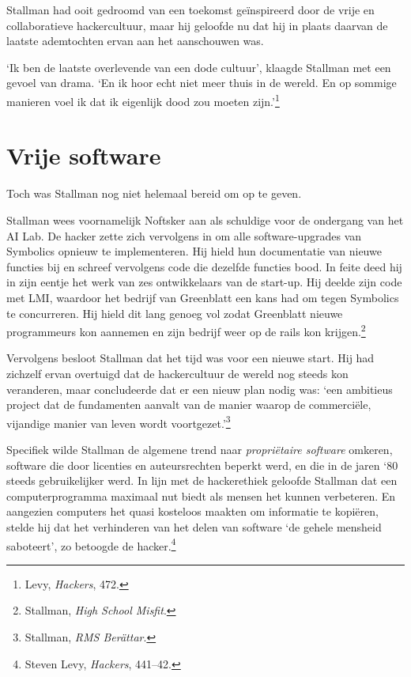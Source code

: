 \documentclass[
  a5paper,
  smalldemyvopaper,11pt,twoside,onecolumn,openright,extrafontsizes,
hidelinks]{memoir}
\begin{document}
Stallman had ooit gedroomd van een toekomst geïnspireerd door de vrije
en collaboratieve hackercultuur, maar hij geloofde nu dat hij in plaats
daarvan de laatste ademtochten ervan aan het aanschouwen was.

`Ik ben de laatste overlevende van een dode cultuur', klaagde Stallman
met een gevoel van drama. `En ik hoor echt niet meer thuis in de wereld.
En op sommige manieren voel ik dat ik eigenlijk dood zou moeten
zijn.'\footnote{\hspace{0pt}Levy, \emph{Hackers}, 472.}

\section{Vrije software}\label{vrije-software}

Toch was Stallman nog niet helemaal bereid om op te geven.

Stallman wees voornamelijk Noftsker aan als schuldige voor de ondergang
van het AI Lab. De hacker zette zich vervolgens in om alle
software-upgrades van Symbolics opnieuw te implementeren. Hij hield hun
documentatie van nieuwe functies bij en schreef vervolgens code die
dezelfde functies bood. In feite deed hij in zijn eentje het werk van
zes ontwikkelaars van de start-up. Hij deelde zijn code met LMI,
waardoor het bedrijf van Greenblatt een kans had om tegen Symbolics te
concurreren. Hij hield dit lang genoeg vol zodat Greenblatt nieuwe
programmeurs kon aannemen en zijn bedrijf weer op de rails kon
krijgen.\footnote{\hspace{0pt}Stallman, \emph{High School Misfit}.}

Vervolgens besloot Stallman dat het tijd was voor een nieuwe start. Hij
had zichzelf ervan overtuigd dat de hackercultuur de wereld nog steeds
kon veranderen, maar concludeerde dat er een nieuw plan nodig was: `een
ambitieus project dat de fundamenten aanvalt van de manier waarop de
commerciële, vijandige manier van leven wordt voortgezet.'\footnote{\hspace{0pt}Stallman,
  \emph{RMS Berättar}.}

Specifiek wilde Stallman de algemene trend naar \emph{propriëtaire
software} omkeren, software die door licenties en auteursrechten beperkt
werd, en die in de jaren `80 steeds gebruikelijker werd. In lijn met de
hackerethiek geloofde Stallman dat een computerprogramma maximaal nut
biedt als mensen het kunnen verbeteren. En aangezien computers het quasi
kosteloos maakten om informatie te kopiëren, stelde hij dat het
verhinderen van het delen van software `de gehele mensheid saboteert',
zo betoogde de hacker.\footnote{\hspace{0pt}Steven Levy, \emph{Hackers},
  441--42.}
\end{document}
